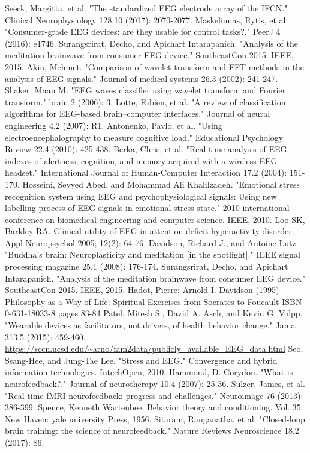 \documentclass{llncs} %
\begin{document}
\begin{thebibliography}{[MT1]}
    Seeck, Margitta, et al. "The standardized EEG electrode array of the IFCN." Clinical Neurophysiology 128.10 (2017): 2070-2077.
    Maskeliunas, Rytis, et al. "Consumer-grade EEG devices: are they usable for control tasks?." PeerJ 4 (2016): e1746.
    Surangsrirat, Decho, and Apichart Intarapanich. "Analysis of the meditation brainwave from consumer EEG device." SoutheastCon 2015. IEEE, 2015.
    Akin, Mehmet. "Comparison of wavelet transform and FFT methods in the analysis of EEG signals." Journal of medical systems 26.3 (2002): 241-247.
    Shaker, Maan M. "EEG waves classifier using wavelet transform and Fourier transform." brain 2 (2006): 3.
    Lotte, Fabien, et al. "A review of classification algorithms for EEG-based brain–computer interfaces." Journal of neural engineering 4.2 (2007): R1.
    Antonenko, Pavlo, et al. "Using electroencephalography to measure cognitive load." Educational Psychology Review 22.4 (2010): 425-438.
    Berka, Chris, et al. "Real-time analysis of EEG indexes of alertness, cognition, and memory acquired with a wireless EEG headset." International Journal of Human-Computer Interaction 17.2 (2004): 151-170.
    Hosseini, Seyyed Abed, and Mohammad Ali Khalilzadeh. "Emotional stress recognition system using EEG and psychophysiological signals: Using new labelling process of EEG signals in emotional stress state." 2010 international conference on biomedical engineering and computer science. IEEE, 2010.
    Loo SK, Barkley RA. Clinical utility of EEG in attention deficit hyperactivity disorder. Appl Neuropsychol 2005; 12(2): 64-76.
    Davidson, Richard J., and Antoine Lutz. "Buddha's brain: Neuroplasticity and meditation [in the spotlight]." IEEE signal processing magazine 25.1 (2008): 176-174.
    Surangsrirat, Decho, and Apichart Intarapanich. "Analysis of the meditation brainwave from consumer EEG device." SoutheastCon 2015. IEEE, 2015.
    Hadot, Pierre; Arnold I. Davidson (1995) Philosophy as a Way of Life: Spiritual Exercises from Socrates to Foucault ISBN 0-631-18033-8 pages 83-84
    Patel, Mitesh S., David A. Asch, and Kevin G. Volpp. "Wearable devices as facilitators, not drivers, of health behavior change." Jama 313.5 (2015): 459-460.
    \url{https://sccn.ucsd.edu/~arno/fam2data/publicly_available_EEG_data.html}
    Seo, Ssang-Hee, and Jung-Tae Lee. "Stress and EEG." Convergence and hybrid information technologies. IntechOpen, 2010.
    Hammond, D. Corydon. "What is neurofeedback?." Journal of neurotherapy 10.4 (2007): 25-36.
    Sulzer, James, et al. "Real-time fMRI neurofeedback: progress and challenges." Neuroimage 76 (2013): 386-399.
    Spence, Kenneth Wartenbee. Behavior theory and conditioning. Vol. 35. New Haven: yale university Press, 1956.
    Sitaram, Ranganatha, et al. "Closed-loop brain training: the science of neurofeedback." Nature Reviews Neuroscience 18.2 (2017): 86.
\end{thebibliography}
\end{document}
